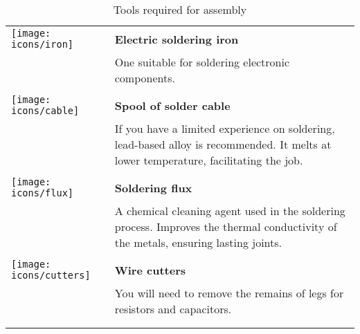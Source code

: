 \begin{longtable}{m{10mm}|m{100mm}}
	\centering
	\texttt{[image: icons/iron]}    & {\bf Electric soldering iron}                                                                                                        \\
	                                & One suitable for soldering electronic components.                                                                                    \\
	                                &                                                                                                                                      \\
	\texttt{[image: icons/cable]}   & {\bf Spool of solder cable}                                                                                                          \\
	                                & If you have a limited experience on soldering, lead-based alloy is recommended. It melts at lower temperature, facilitating the job. \\
	                                &                                                                                                                                      \\
	\texttt{[image: icons/flux]}    & {\bf Soldering flux}                                                                                                                 \\
	                                & A chemical cleaning agent used in the soldering process. Improves the thermal conductivity of the metals, ensuring lasting joints.   \\
	                                &                                                                                                                                      \\
	\texttt{[image: icons/cutters]} & {\bf Wire cutters}                                                                                                                   \\
	                                & You will need to remove the remains of legs for resistors and capacitors.                                                            \\
	                                &                                                                                                                                      \\
	\caption{Tools required for assembly}
	\label{table:assembly-tools}
\end{longtable}

